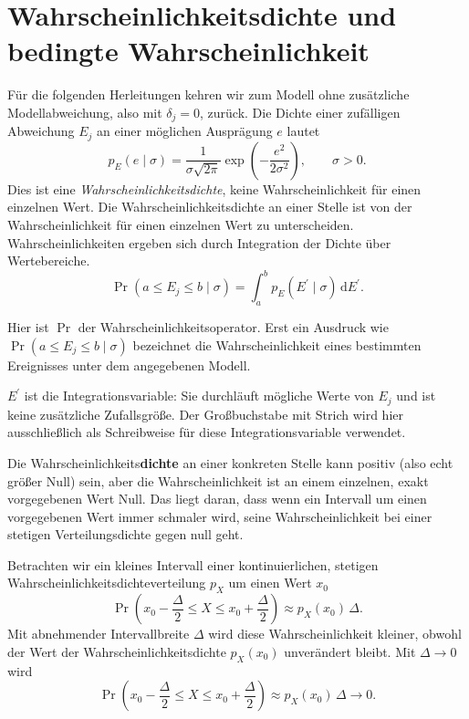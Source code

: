 \section{Wahrscheinlichkeitsdichte und bedingte Wahrscheinlichkeit}
\label{V4Dichte}
Für die folgenden Herleitungen kehren wir zum Modell ohne zusätzliche
Modellabweichung, also mit $\delta_j=0$, zurück.
Die Dichte einer zufälligen Abweichung $E_j$ an einer möglichen
Ausprägung $e$ lautet
\begin{equation}
p_E(e\mid\sigma)=\frac{1}{\sigma\sqrt{2\pi}}
\exp\!\left(-\frac{e^2}{2\sigma^2}\right),\qquad \sigma>0.
\label{Maximumlikelihood1}
\end{equation}
Dies ist eine \textsl{Wahrscheinlichkeitsdichte}, keine Wahrscheinlichkeit
für einen einzelnen Wert. Die Wahrscheinlichkeitsdichte an einer Stelle ist von der Wahrscheinlichkeit für einen einzelnen Wert zu unterscheiden. Wahrscheinlichkeiten ergeben sich durch Integration der Dichte über Wertebereiche.
\begin{equation}
\Pr(a\le E_j\le b\mid\sigma)
=\int_a^b p_E(E^\prime\mid\sigma)\,\mathrm{d}E^\prime.
\label{eq:wahrscheinlichkeitgegebensigma}
\end{equation}

Hier ist $\Pr$ der Wahrscheinlichkeitsoperator. Erst ein Ausdruck wie
$\Pr(a\le E_j\le b\mid\sigma)$ bezeichnet die Wahrscheinlichkeit eines
bestimmten Ereignisses unter dem angegebenen Modell.

$E^\prime$ ist die Integrationsvariable: Sie durchläuft mögliche Werte
von $E_j$ und ist keine zusätzliche Zufallsgröße. Der Großbuchstabe
mit Strich wird hier ausschließlich als Schreibweise für diese
Integrationsvariable verwendet.

Die Wahrscheinlichkeits\textbf{dichte} an einer konkreten Stelle kann positiv (also echt größer Null) sein, aber die Wahrscheinlichkeit ist an einem einzelnen, exakt vorgegebenen Wert Null. Das liegt daran, dass wenn ein Intervall um einen vorgegebenen Wert immer schmaler wird, seine Wahrscheinlichkeit bei einer stetigen Verteilungsdichte gegen null geht.

Betrachten wir ein kleines Intervall einer kontinuierlichen, stetigen Wahrscheinlichkeitsdichteverteilung $p_X$ um einen Wert $x_0$
\[
\Pr\!\left(x_0-\frac{\Delta}{2}\le X\le x_0+\frac{\Delta}{2}\right)
\approx p_X(x_0)\,\Delta.
\]
Mit abnehmender Intervallbreite $\Delta$ wird diese Wahrscheinlichkeit kleiner, obwohl der Wert der Wahrscheinlichkeitsdichte $p_X(x_0)$ unverändert bleibt. Mit $\Delta \rightarrow 0$ wird 
\[
\Pr\!\left(x_0-\frac{\Delta}{2}\le X\le x_0+\frac{\Delta}{2}\right)
\approx p_X(x_0)\,\Delta \rightarrow 0.
\]

